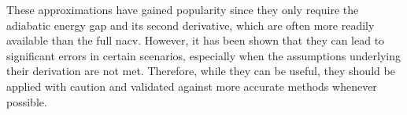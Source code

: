These approximations have gained popularity since they only require the adiabatic energy gap and its second derivative, which are often more readily available than the full \gls{nacv}. However, it has been shown that they can lead to significant errors in certain scenarios, especially when the assumptions underlying their derivation are not met. Therefore, while they can be useful, they should be applied with caution and validated against more accurate methods whenever possible.\supercite{10.1021/acs.jctc.5c01176}
